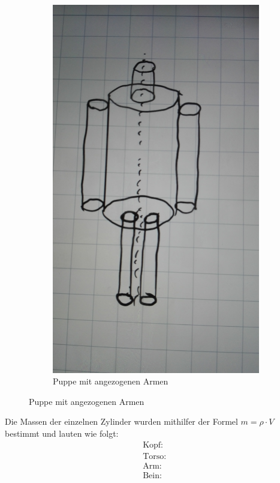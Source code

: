 \begin{figure}[H]
\begin{subfigure}{0.495\linewidth}
\includegraphics[width=\textwidth]{images/puppe_an.jpg}
\caption{Puppe mit angezogenen Armen}
\end{subfigure}
\end{figure}

Die Massen der einzelnen Zylinder wurden mithilfer der Formel $m= \rho \cdot V$ bestimmt und lauten wie folgt:
\begin{subequations}
\begin{align}
\text{Kopf: }\label{eq:Kopf}\\
\text{Torso: }\label{eq:Torso}\\
\text{Arm: }\label{eq:Arm}\\
\text{Bein: }\label{eq:Bein}
\end{align}
\end{subequations}

